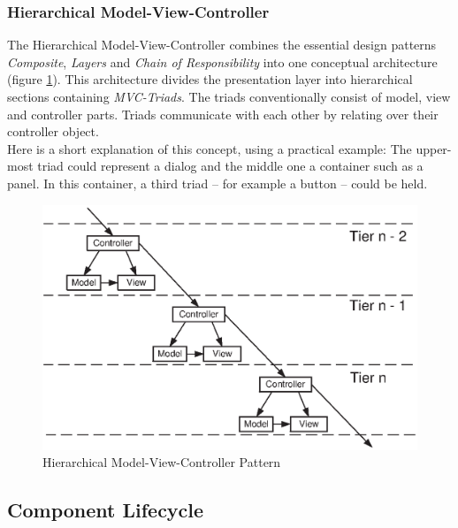 \subsubsection{Hierarchical Model-View-Controller}
\label{hierarchical_model_view_controller_heading}

The Hierarchical Model-View-Controller \cite{cai} combines the essential design
patterns \emph{Composite}, \emph{Layers} and \emph{Chain of Responsibility}
into one conceptual architecture (figure \ref{hierarchical_model_view_controller_figure}).
This architecture divides the presentation layer into hierarchical sections
containing \emph{MVC-Triads}. The triads conventionally consist of model, view
and controller parts. Triads communicate with each other by relating over their
controller object.\\
Here is a short explanation of this concept, using a practical example:
The upper-most triad could represent a dialog and the middle one a container
such as a panel. In this container, a third triad -- for example a button --
could be held.

\begin{figure}[ht]
    \begin{center}
       \includegraphics[scale=0.5]{eps/hmvc.eps}
       \caption{Hierarchical Model-View-Controller Pattern}
       \label{hierarchical_model_view_controller_figure}
    \end{center}
\end{figure}

\subsection{Component Lifecycle}
\label{component_lifecycle_heading}

